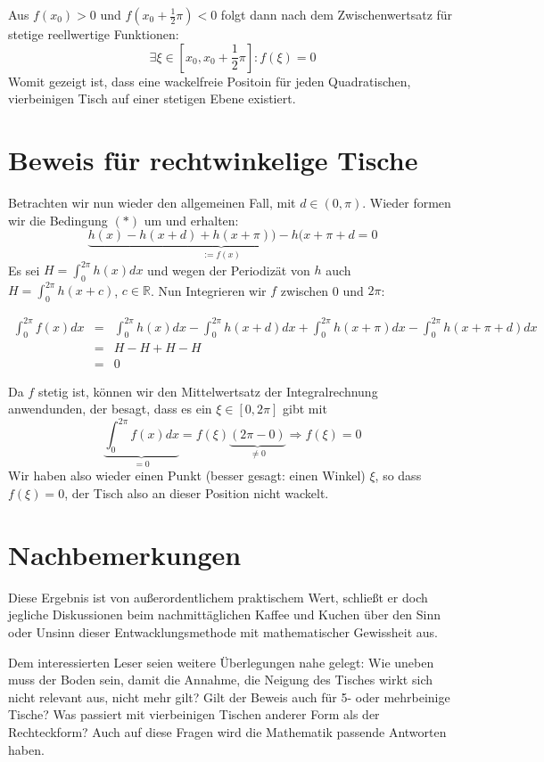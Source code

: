 \documentclass{amsart}
\begin{document}
Aus $f(x_0) > 0 $ und $f(x_0 +\frac{1}2 \pi ) < 0$ folgt dann nach dem Zwischenwertsatz für stetige reellwertige Funktionen:
$$ \exists\xi \in[x_0,x_0+\frac{1}2\pi]: f(\xi) = 0$$
Womit gezeigt ist, dass eine wackelfreie Positoin für jeden Quadratischen, vierbeinigen Tisch auf einer stetigen Ebene existiert.

\section{Beweis für rechtwinkelige Tische}

Betrachten wir nun wieder den allgemeinen Fall, mit $d\in(0,\pi)$. Wieder formen wir die Bedingung $(*)$ um und erhalten:
$$ \underbrace{h(x) - h(x+d) + h(x+\pi)) - h(x+\pi+d}_{:= f(x)} = 0$$
Es sei $H=\int_0^{2\pi}h(x)dx$ und wegen der Periodizät von $h$ auch $H=\int_0^{2\pi}h(x+c)$, $c\in\mathbb{R}$. Nun Integrieren wir $f$ zwischen 0 und $2\pi$:

\begin{eqnarray*}
\int_0^{2\pi}f(x)dx & =& \int_0^{2\pi} h(x)dx - \int_0^{2\pi}h(x+d)dx + \int_0^{2\pi}h(x+\pi)dx - \int_0^{2\pi}h(x+\pi+d)dx \\
	& = & H - H + H - H \\
        & =& 0
\end{eqnarray*}

Da $f$ stetig ist, können wir den Mittelwertsatz der Integralrechnung anwendunden, der besagt, dass es ein $\xi \in [0,2\pi]$ gibt mit 
$$ \underbrace{\int_0^{2\pi}f(x)dx}_{=0} = f(\xi)\underbrace{(2\pi - 0)}_{\ne 0} \Rightarrow f(\xi) = 0 $$
Wir haben also wieder einen Punkt (besser gesagt: einen Winkel) $\xi$, so dass $f(\xi)=0$, der Tisch also an dieser Position nicht wackelt.

\section{Nachbemerkungen}

Diese Ergebnis ist von außerordentlichem praktischem Wert, schließt er doch jegliche Diskussionen beim nachmittäglichen Kaffee und Kuchen über den Sinn oder Unsinn dieser Entwacklungsmethode mit mathematischer Gewissheit aus.

Dem interessierten Leser seien weitere Überlegungen nahe gelegt: Wie uneben muss der Boden sein, damit die Annahme, die Neigung des Tisches wirkt sich nicht relevant aus, nicht mehr gilt? Gilt der Beweis auch für 5- oder mehrbeinige Tische? Was passiert mit vierbeinigen Tischen anderer Form als der Rechteckform? Auch auf diese Fragen wird die Mathematik passende Antworten haben.
\end{document}
